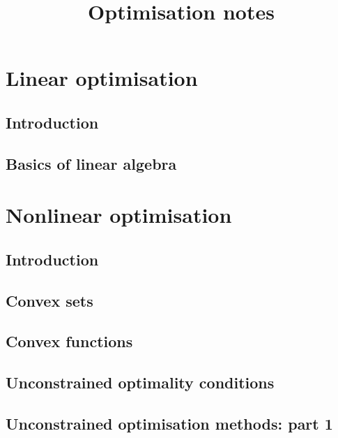 \documentclass{bookest}
\title{Optimisation notes}
\begin{document}
	\maketitle

	\tableofcontents
	
	\part{Linear optimisation}
	
	\chapter{Introduction}
	
		
	\chapter{Basics of linear algebra}
	
	
	
	\part{Nonlinear optimisation}
		
	\chapter{Introduction}
	
	
	\chapter{Convex sets}
	
	
	\chapter{Convex functions}
	
	
	\chapter{Unconstrained optimality conditions}
	
	
	\chapter{Unconstrained optimisation methods: part 1}
	
	
\end{document}

